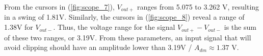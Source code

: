 \FloatBarrier

From the cursors in (\ref{fig:scope_7}), $V_{out+}$ ranges from 5.075 to 3.262 \si{\volt}, resulting in a swing of 1.81\si{\volt}.
Similarly, the cursors in (\ref{fig:scope_8}) reveal a range of 1.38\si{\volt} for $V_{out-}$.
Thus, the voltage range for the signal $V_{out+} - V_{out-}$ is the sum of these two ranges, or 3.19\si{\volt}.
From these parameters, an input signal that will avoid clipping should have an amplitude lower than 3.19\si{\volt} / $A_{dm} \approx 1.37$ \si{\volt}.
